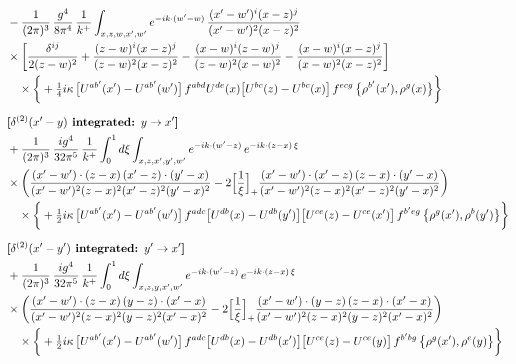 \documentclass[10pt]{article}
\numberwithin{equation}{section}
\begin{document}
\begin{align}
&-\frac{1}{(2\pi)^{3}}\,\frac{g^{4}}{8\pi^{4}}\,\frac{1}{k^{+}}\int_{x,z,w,x^{\prime},w^{\prime}}e^{-ik\cdot(w^{\prime}-w)}\,\frac{(x^{\prime}-w^{\prime})^{i}(x-z)^{j}}{(x^{\prime}-w^{\prime})^{2}(x-z)^{2}}\notag\\
&\times\bigg[\frac{\delta^{ij}}{2(z-w)^{2}}+\frac{(z-w)^{i}(x-z)^{j}}{(z-w)^{2}(x-z)^{2}}-\frac{(x-w)^{i}(z-w)^{j}}{(z-w)^{2}(x-w)^{2}}-\frac{(x-w)^{i}(x-z)^{j}}{(x-w)^{2}(x-z)^{2}}\bigg]\notag\\
&\quad\times\bigg\{+\tfrac14 i\kappa\,\big[U^{ab^{\prime}}(x^{\prime})-U^{ab^{\prime}}(w^{\prime})\big]\,f^{abd}U^{de}(x)\big[U^{bc}(z)-U^{bc}(x)\big]\,f^{ecg}\,\big\{\rho^{b^{\prime}}(x^{\prime}),\rho^{g}(x)\big\}\bigg\}\notag\\[6pt]
&\textbf{[$\delta^{(2)}(x^{\prime}-y)$ integrated: $y\to x^{\prime}$]}\notag\\
&+\frac{1}{(2\pi)^{3}}\,\frac{ig^{4}}{32\pi^{5}}\,\frac{1}{k^{+}}\int_{0}^{1}d\xi\int_{x,z,x^{\prime},y^{\prime},w^{\prime}}e^{-ik\cdot(w^{\prime}-z)}\,e^{-ik\cdot(z-x)\,\xi}\notag\\
&\times\bigg(\frac{(x^{\prime}-w^{\prime})\cdot(z-x)\,(x^{\prime}-z)\cdot(y^{\prime}-x)}{(x^{\prime}-w^{\prime})^{2}(z-x)^{2}(x^{\prime}-z)^{2}(y^{\prime}-x)^{2}}-2\Big[\frac{1}{\xi}\Big]_{+}\frac{(x^{\prime}-w^{\prime})\cdot(x^{\prime}-z)\,(z-x)\cdot(y^{\prime}-x)}{(x^{\prime}-w^{\prime})^{2}(z-x)^{2}(x^{\prime}-z)^{2}(y^{\prime}-x)^{2}}\bigg)\notag\\
&\quad\times\bigg\{+\tfrac12 i\kappa\,\big[U^{ab^{\prime}}(x^{\prime})-U^{ab^{\prime}}(w^{\prime})\big]\,f^{adc}\big[U^{db}(x)-U^{db}(y^{\prime})\big]\big[U^{ce}(z)-U^{ce}(x^{\prime})\big]\,f^{b^{\prime}eg}\,\big\{\rho^{g}(x^{\prime}),\rho^{b}(y^{\prime})\big\}\bigg\}\notag\\[6pt]
&\textbf{[$\delta^{(2)}(x^{\prime}-y^{\prime})$ integrated: $y^{\prime}\to x^{\prime}$]}\notag\\
&+\frac{1}{(2\pi)^{3}}\,\frac{ig^{4}}{32\pi^{5}}\,\frac{1}{k^{+}}\int_{0}^{1}d\xi\int_{x,z,y,x^{\prime},w^{\prime}}e^{-ik\cdot(w^{\prime}-z)}\,e^{-ik\cdot(z-x)\,\xi}\notag\\
&\times\bigg(\frac{(x^{\prime}-w^{\prime})\cdot(z-x)\,(y-z)\cdot(x^{\prime}-x)}{(x^{\prime}-w^{\prime})^{2}(z-x)^{2}(y-z)^{2}(x^{\prime}-x)^{2}}-2\Big[\frac{1}{\xi}\Big]_{+}\frac{(x^{\prime}-w^{\prime})\cdot(y-z)\,(z-x)\cdot(x^{\prime}-x)}{(x^{\prime}-w^{\prime})^{2}(z-x)^{2}(y-z)^{2}(x^{\prime}-x)^{2}}\bigg)\notag\\
&\quad\times\bigg\{+\tfrac12 i\kappa\,\big[U^{ab^{\prime}}(x^{\prime})-U^{ab^{\prime}}(w^{\prime})\big]\,f^{adc}\big[U^{db}(x)-U^{db}(x^{\prime})\big]\big[U^{ce}(z)-U^{ce}(y)\big]\,f^{b^{\prime}bg}\,\big\{\rho^{g}(x^{\prime}),\rho^{e}(y)\big\}\bigg\}\notag\\[6pt]

\end{align}
\end{document}
